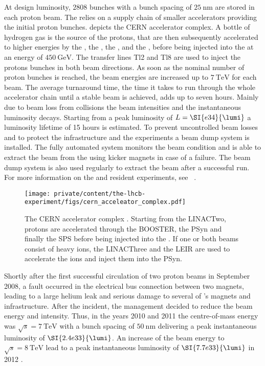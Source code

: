 At design luminosity, $\num{2808}$ bunches with a bunch spacing of
$\SI{25}{\nano\metre}$ are stored in each proton beam. The \LHC relies on a
supply chain of smaller accelerators providing the initial proton bunches.
 depicts the \acs{CERN}
accelerator complex. A bottle of hydrogen gas is the source of the protons, that
are then subsequently accelerated to higher energies by the \LINACTwo, the
\BOOSTER, the \PSyn, and the \SPS, before being injected into the \LHC at an
energy of $\SI{450}{\GeV}$. The transfer lines Tl2 and Tl8 are used to inject
the protons bunches in both beam directions. As soon as the nominal number of
proton bunches is reached, the beam energies are increased up to $\SI{7}{\TeV}$
for each beam. The average \LHC turnaround time, \ie the time it takes to run
through the whole accelerator chain until a stable beam is achieved, adds up to
seven hours. Mainly due to beam loss from \pp collisions the beam intensities
and the instantaneous luminosity decays. Starting from a peak luminosity of
$L=\SI{e34}{\lumi}$ a luminosity lifetime of 15 hours is estimated. To prevent
uncontrolled beam losses and to protect the \LHC infrastructure and the \LHC
experiments a beam dump system is installed. The fully automated system monitors
the beam condition and is able to extract the beam from the \LHC using kicker
magnets in case of a failure. The beam dump system is also used regularly to
extract the beam after a successful run. For more information on the \LHC and
resident experiments, see \eg \Ref~\cite{Evans:2008zzb}.

\begin{figure}[t]
  \texttt{[image: private/content/the-lhcb-experiment/figs/cern\_acceleator\_complex.pdf]}
  \caption{
  The \acs{CERN} accelerator complex \cite{Christiane:1260465}. Starting from
  the \acs{LINACTwo}, protons are accelerated through the \acs{BOOSTER}, the
  \acs{PSyn} and finally the \acs{SPS} before being injected into the \LHC. If
  one or both beams consist of heavy ions, the \acs*{LINACThree} and the
  \acs*{LEIR} are used to accelerate the ions and inject them into the
  \acs{PSyn}. }
  \label{fig:lhcb_experiment:lhc:cern_accelerator_complex}
\end{figure}

Shortly after the first successful circulation of two proton beams in September
2008, a fault occurred in the electrical bus connection between two magnets,
leading to a large helium leak and serious damage to several of \LHC's magnets
and infrastructure. After the incident, the management decided to reduce the
beam energy and intensity. Thus, in the years 2010 and 2011 the \LHC
centre-of-mass energy was $\sqrt{s}=\SI{7}{\TeV}$ with a bunch spacing of
$\SI{50}{\nano\metre}$ delivering a peak instantaneous luminosity of
$\SI{2.4e33}{\lumi}$. An increase of the beam energy to $\sqrt{s}=\SI{8}{\TeV}$
lead to a peak instantaneous luminosity of $\SI{7.7e33}{\lumi}$ in 2012
\cite{Lamont:2013cma}.

